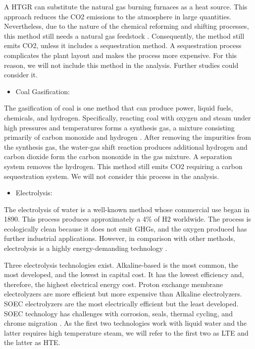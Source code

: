 \documentclass[11pt,letterpaper]{article}
\begin{document}
A \gls{HTGR} can substitute the natural gas burning furnaces as a heat source.
This approach reduces the \gls{CO2} emissions to the atmosphere in large quantities.
Nevertheless, due to the nature of the chemical reforming and shifting processes, this method still needs a natural gas feedstock \cite{yildiz_efficiency_2006}. 
Consequently, the method still emits \gls{CO2}, unless it includes a sequestration method.
A sequestration process complicates the plant layout and makes the process more expensive.
For this reason, we will not include this method in the analysis.
Further studies could consider it.

\begin{itemize}
	\item Coal Gasification:
\end{itemize}

The gasification of coal is one method that can produce power, liquid fuels, chemicals, and hydrogen.
Specifically, reacting coal with oxygen and steam under high pressures and temperatures forms a synthesis gas, a mixture consisting primarily of carbon monoxide and hydrogen \cite{doe_office_of_energy_efficiency_and_renewable_energy_hydrogen_2020}.
After removing the impurities from the synthesis gas, the water-gas shift reaction produces additional hydrogen and carbon dioxide form the carbon monoxide in the gas mixture.
A separation system removes the hydrogen.
This method still emits \gls{CO2} requiring a carbon sequestration system. 
We will not consider this process in the analysis.

\begin{itemize}
	\item Electrolysis: 
\end{itemize}

The electrolysis of water is a well-known method whose commercial use began in 1890.
This process produces approximately a 4\% of \gls{H2} worldwide.
The process is ecologically clean because it does not emit \glspl{GHG}, and the oxygen
produced has further industrial applications.
However, in comparison with other methods, electrolysis is a highly energy-demanding technology 
\cite{kalamaras_hydrogen_2013}.

Three electrolysis technologies exist.
Alkaline-based is the most common, the most developed, and the lowest in capital cost.
It has the lowest efficiency and, therefore, the highest electrical energy cost.
Proton exchange membrane electrolyzers are more efficient but more expensive than Alkaline electrolyzers.
\gls{SOEC} electrolyzers are the most electrically efficient but the least developed.
\gls{SOEC} technology has challenges with corrosion, seals, thermal cycling, and chrome migration \cite{kalamaras_hydrogen_2013}.
As the first two technologies work with liquid water and the latter requires high temperature steam, we will refer to the first two as \gls{LTE} and the latter as \gls{HTE}.
\end{document}
